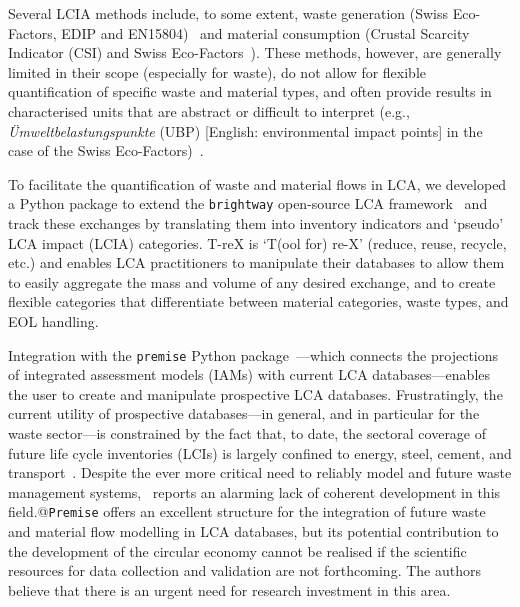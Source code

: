 Several LCIA methods include, to some extent, waste generation (Swiss Eco-Factors, EDIP and EN15804)~\citep{foen2021ecofactors,hauschild2003edip,cen2019en15804} and material consumption (Crustal Scarcity Indicator (CSI) and Swiss Eco-Factors~\citep{arvidsson2020csi,foen2021ecofactors}). These methods, however, are generally limited in their scope (especially for waste), do not allow for flexible quantification of specific waste and material types, and often provide results in characterised units that are abstract or difficult to interpret (e.g., \textit{Ümweltbelastungspunkte} (UBP) [English: environmental impact points] in the case of the Swiss Eco-Factors)~\citep{su2020sustainableproddev}.


To facilitate the quantification of waste and material flows in LCA, we developed a Python package to extend the \texttt{brightway} open-source LCA framework~\citep{mutel2017brightway} and track these exchanges by translating them into inventory indicators and `pseudo' LCA impact (LCIA) categories. T-reX is `T(ool for) re-X' (reduce, reuse, recycle, etc.) and enables LCA practitioners to manipulate their databases to allow them to easily aggregate the mass and volume of any desired exchange, and to create flexible categories that differentiate between material categories, waste types, and EOL handling.

Integration with the \texttt{premise} Python package~\citep{sacchi2022premise}---which connects the projections of integrated assessment models (IAMs) with current LCA databases---enables the user to create and manipulate prospective LCA databases. Frustratingly, the current utility of prospective databases---in general, and in particular for the waste sector---is constrained by the fact that, to date, the sectoral coverage of future life cycle inventories (LCIs) is largely confined to energy, steel, cement, and transport~\citep{sacchi2023premisedocs}. Despite the ever more critical need to reliably model and future waste management systems,~\cite{bisinella2024wastelca} reports an alarming lack of coherent development in this field.@\texttt{Premise} offers an excellent structure for the integration of future waste and material flow modelling in LCA databases, but its potential contribution to the development of the circular economy cannot be realised if the scientific resources for data collection and validation are not forthcoming. The authors believe that there is an urgent need for research investment in this area.

